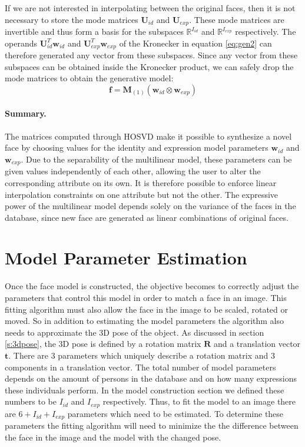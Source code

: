 \documentclass[11pt,a4paper]{report}
\begin{document}
If we are not interested in interpolating between the original faces, then it is
not necessary to store the mode matrices $\mathbf{U}_{id}$ and
$\mathbf{U}_{exp}$. These mode matrices are invertible and thus form a
basis for the subspaces $\mathbb{R}^{I_{id}}$ and $\mathbb{R}^{I_{exp}}$
respectively. The operands $\mathbf{U}_{id}^T\mathbf{w}_{id}$ and 
$\mathbf{U}_{exp}^T\mathbf{w}_{exp}$ of the Kronecker in equation \ref{eq:gen2}
can therefore generated any vector from these subspaces. Since any vector from these
subspaces can be obtained inside the Kronecker product, we can safely drop the mode matrices to obtain the generative model:
\begin{equation}\label{eq:gen4}
\mathbf{f} = \mathbf{M}_{(1)}(\mathbf{w}_{id} \otimes \mathbf{w}_{exp})
\end{equation}
\paragraph{Summary.} The matrices computed through HOSVD make it possible to synthesize a novel face by
choosing values for the identity and expression model parameters $\mathbf{w}_{id}$ and
$\mathbf{w}_{exp}$. Due to the separability of the multilinear model, these
parameters can be given values independently of each other, allowing the user to alter the
corresponding attribute on its own. It is therefore possible to enforce
linear interpolation constraints on one attribute but not the other. The expressive power of the multilinear model depends solely on the
variance of the faces in the database, since new face are generated as linear
combinations of original faces.

\section{Model Parameter Estimation}
Once the face model is constructed, the objective becomes to correctly adjust the
parameters that control this model in order to match a face in an
image. This fitting algorithm must also allow the face in the image to be scaled,
rotated or moved. So in addition to estimating the model parameters the
algorithm also needs to
approximate the 3D pose of the object. As discussed in section \ref{s:3dpose},
the 3D pose is defined by a rotation matrix $\mathbf{R}$ and a translation
vector $\mathbf{t}$. There are 3 parameters which uniquely describe a rotation
matrix and 3 components in a translation vector. The total number of model parameters depends on
the amount of persons in the database and on how many expressions these
individuals perform. In the model construction section we defined these numbers
to be $I_{id}$ and $I_{exp}$ respectively. Thus, to fit the model to an image there
are $6+I_{id}+I_{exp}$ parameters which need to be estimated. To determine
these parameters the fitting algorithm will need to minimize the the difference
between the face in the image and the model with the changed pose.
\end{document}
